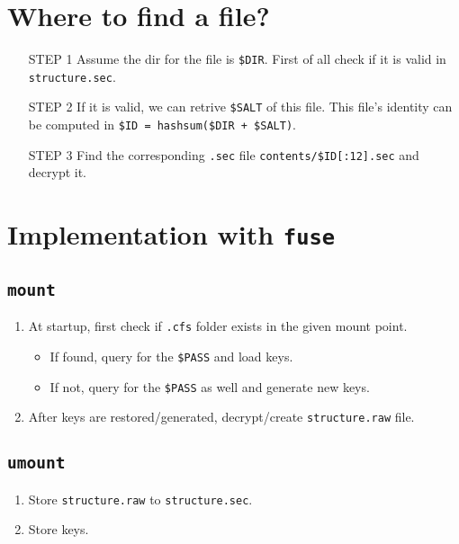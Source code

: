 \documentclass{article}
\begin{document}
\section{Where to find a file?}

\begin{itemize}
    \item [STEP 1] Assume the dir for the file is \texttt{\$DIR}. First of all check if it is valid in \texttt{structure.sec}.
    \item [STEP 2] If it is valid, we can retrive \texttt{\$SALT} of this file. This file's identity can be computed in \texttt{\$ID = hashsum(\$DIR + \$SALT)}.
    \item [STEP 3] Find the corresponding \texttt{.sec} file \texttt{contents/\$ID[:12].sec} and decrypt it.
\end{itemize}

\section{Implementation with \texttt{fuse}}

\subsection{\texttt{mount}}


\begin{enumerate}
    \item 
At startup, first check if \texttt{.cfs} folder exists in the given mount point.

\begin{itemize}
    \item If found, query for the \texttt{\$PASS} and load keys.
    \item If not, query for the \texttt{\$PASS} as well and generate new keys.
\end{itemize}
    \item After keys are restored/generated, decrypt/create \texttt{structure.raw} file.
\end{enumerate}



\subsection{\texttt{umount}}

\begin{enumerate}
    \item Store \texttt{structure.raw} to \texttt{structure.sec}.
    \item Store keys.
\end{enumerate}
\end{document}
